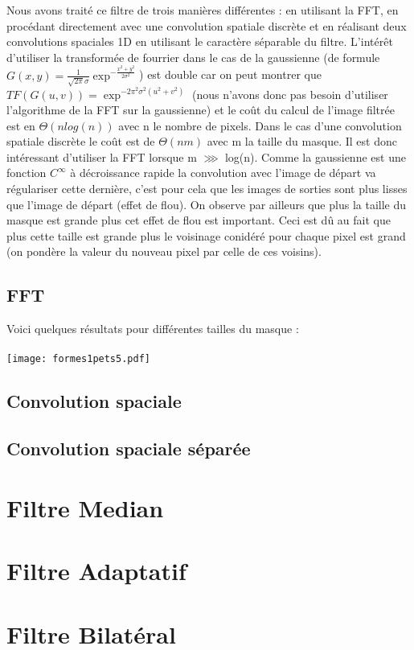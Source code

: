 \documentclass[12pt]{article}
\numberwithin{equation}{section}
\begin{document}
Nous avons traité ce filtre de trois manières différentes : en utilisant la FFT, en procédant directement avec une convolution spatiale discrète et en réalisant deux convolutions spaciales 1D en utilisant le caractère séparable du filtre. L'intérêt d'utiliser la transformée de fourrier dans le cas de la gaussienne (de formule $G(x,y) = \frac{1}{\sqrt{2\pi }\sigma}\exp^{-\frac{x^2 + y^2}{2\sigma^2}}$) est double car on peut montrer que $TF(G(u,v)) = \exp^{-2\pi^2 \sigma^2(u^2 + v^2)}$ (nous n'avons donc pas besoin d'utiliser l'algorithme de la FFT sur la gaussienne) et le coût du calcul de l'image filtrée est en $\Theta(nlog(n))$ avec n le nombre de pixels. Dans le cas d'une convolution spatiale discrète le coût est de $\Theta(nm)$ avec m la taille du masque. Il est donc intéressant d'utiliser la FFT lorsque m $\ggg $ log(n). 
Comme la gaussienne est une fonction $C^\infty$ à décroissance rapide la convolution avec l'image de départ va régulariser cette dernière, c'est pour cela que les images de sorties sont plus lisses que l'image de départ (effet de flou). On observe par ailleurs que plus la taille du masque est grande plus cet effet de flou est important. Ceci est dû au fait que plus cette taille est grande plus le voisinage conidéré pour chaque pixel est grand (on pondère la valeur du nouveau pixel par celle de ces voisins).\\
\subsection{FFT}
Voici quelques résultats pour différentes tailles du masque : \\\\
\texttt{[image: formes1pets5.pdf]}\\
\subsection{Convolution spaciale}
\subsection{Convolution spaciale séparée}
\section{Filtre Median}

\section{Filtre Adaptatif}

\section{Filtre Bilatéral}
\end{document}

